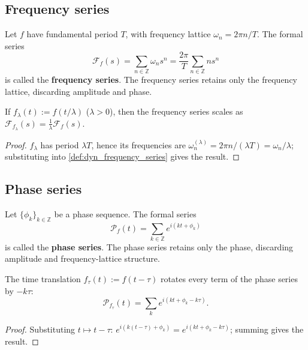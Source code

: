 \subsection{Frequency series}

\begin{definition}\label{def:dyn_frequency_series}
Let $f$ have fundamental period $T$, with frequency lattice $\omega_n=2\pi n/T$. The formal series
\[
\mathcal F_f(s)=\sum_{n\in\mathbb Z}\omega_n s^n=\frac{2\pi}{T}\sum_{n\in\mathbb Z}n s^n
\]
is called the \textbf{frequency series}. The frequency series retains only the frequency lattice, discarding amplitude and phase.
\end{definition}

\begin{proposition}\label{prop:dyn_frequency_scaling}
If $f_\lambda(t):=f(t/\lambda)$ ($\lambda>0$), then the frequency series scales as $\mathcal F_{f_\lambda}(s)=\frac{1}{\lambda}\mathcal F_f(s)$.
\end{proposition}

\begin{proof}
$f_\lambda$ has period $\lambda T$, hence its frequencies are $\omega_n^{(\lambda)}=2\pi n/(\lambda T)=\omega_n/\lambda$; substituting into \cref{def:dyn_frequency_series} gives the result.
\end{proof}

\subsection{Phase series}

\begin{definition}\label{def:dyn_phase_series}
Let $\{\phi_k\}_{k\in\mathbb Z}$ be a phase sequence. The formal series
\[
\mathcal P_f(t)=\sum_{k\in\mathbb Z}e^{i(kt+\phi_k)}
\]
is called the \textbf{phase series}. The phase series retains only the phase, discarding amplitude and frequency-lattice structure.
\end{definition}

\begin{proposition}\label{prop:dyn_phase_translation}
The time translation $f_\tau(t):=f(t-\tau)$ rotates every term of the phase series by $-k\tau$:
\[
\mathcal P_{f_\tau}(t)=\sum_k e^{i(kt+\phi_k-k\tau)}.
\]
\end{proposition}

\begin{proof}
Substituting $t\mapsto t-\tau$: $e^{i(k(t-\tau)+\phi_k)}=e^{i(kt+\phi_k-k\tau)}$; summing gives the result.
\end{proof}

